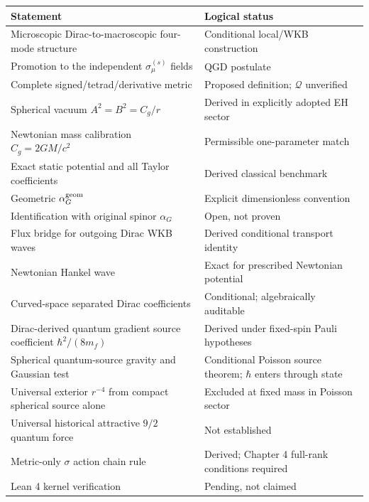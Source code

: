 \documentclass[11pt,a4paper,oneside]{report}
\numberwithin{equation}{chapter}
\theoremstyle{definition}\newtheorem{definition}[theorem]{Definition}
\theoremstyle{remark}\newtheorem{remark}[theorem]{Remark}
\begin{document}
\begin{center}
\begin{tabular}{>{\raggedright\arraybackslash}p{}>{\raggedright\arraybackslash}p{}}
\toprule
Statement & Logical status\\\midrule
Microscopic Dirac-to-macroscopic four-mode structure & Conditional local/WKB construction\\
Promotion to the independent $\sigma_{\mu}^{(s)}$ fields & QGD postulate\\
Complete signed/tetrad/derivative metric & Proposed definition; $\mathcal Q$ unverified\\
Spherical vacuum $A^2=B^2=C_g/r$ & Derived in explicitly adopted EH sector\\
Newtonian mass calibration $C_g=2GM/c^2$ & Permissible one-parameter match\\
Exact static potential and all Taylor coefficients & Derived classical benchmark\\
Geometric $\alpha_G^{\rm geom}$ & Explicit dimensionless convention\\
Identification with original spinor $\alpha_G$ & Open, not proven\\
Flux bridge for outgoing Dirac WKB waves & Derived conditional transport identity\\
Newtonian Hankel wave & Exact for prescribed Newtonian potential\\
Curved-space separated Dirac coefficients & Conditional; algebraically auditable\\
Dirac-derived quantum gradient source coefficient $\hbar^2/(8m_f)$ & Derived under fixed-spin Pauli hypotheses\\
Spherical quantum-source gravity and Gaussian test & Conditional Poisson source theorem; $\hbar$ enters through state\\
Universal exterior $r^{-4}$ from compact spherical source alone & Excluded at fixed mass in Poisson sector\\
Universal historical attractive $9/2$ quantum force & Not established\\
Metric-only $\sigma$ action chain rule & Derived; Chapter 4 full-rank conditions required\\
Lean 4 kernel verification & Pending, not claimed\\
\bottomrule
\end{tabular}
\end{center}
\end{document}
